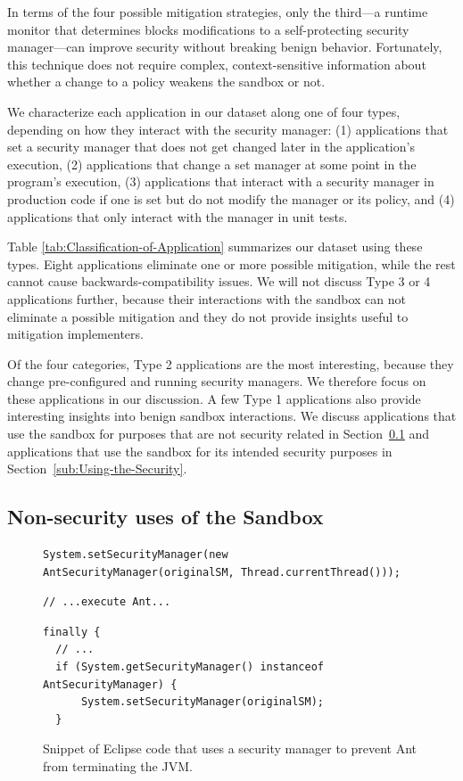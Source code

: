 \documentclass{sig-alternate}
\begin{document}
In terms of the four possible mitigation strategies,
only the third---a runtime monitor that
determines blocks modifications to a self-protecting security manager---can
improve security without breaking benign behavior. 
Fortunately, this technique does not require complex, context-sensitive
information about whether a change to a policy weakens the sandbox or not. 

We characterize each application in our dataset along one of four types, depending on how they
interact with the security manager:
(1) applications that set a
security manager that does not get changed later in the application's
execution, (2) applications that change a set manager at some point
in the program's execution, (3) applications that interact with a
security manager in production code if one is set but do not modify the manager
or its policy, and (4) applications
that only interact with the manager in unit tests. 

Table \ref{tab:Classification-of-Application}
summarizes our dataset using these types. Eight applications eliminate one or more possible mitigation, while the rest cannot cause backwards-compatibility issues. We will
not discuss Type 3 or 4 applications further, because their interactions with
the sandbox can not eliminate a possible mitigation and they do not provide insights useful to mitigation implementers.  

Of the four categories, Type 2 applications are the most interesting, because
they change pre-configured and running security managers.  We therefore focus
on these applications in our discussion. A few Type 1
applications also provide interesting insights into
benign sandbox interactions. We discuss applications that use the sandbox for
purposes that are not security related in Section~\ref{sub:Non-security-uses-of}
and applications that use the sandbox for its intended security purposes in
Section~\ref{sub:Using-the-Security}.

\subsection{Non-security uses of the Sandbox}\label{sub:Non-security-uses-of}

\begin{figure}
\begin{lstlisting}[firstnumber=691]
System.setSecurityManager(new AntSecurityManager(originalSM, Thread.currentThread()));
\end{lstlisting}
\vspace{-0.3cm}
\begin{lstlisting}[firstnumber=703]
// ...execute Ant...
\end{lstlisting}
\vspace{-0.3cm}
\begin{lstlisting}[firstnumber=723]
finally {
  // ...
  if (System.getSecurityManager() instanceof AntSecurityManager) { 
      System.setSecurityManager(originalSM); 
  }
\end{lstlisting}\vspace{-0.3cm}
\caption{Snippet of Eclipse code that uses a security manager to prevent Ant\label{fig:Eclipse-snippet}
from terminating the JVM.}
\end{figure}
\end{document}
